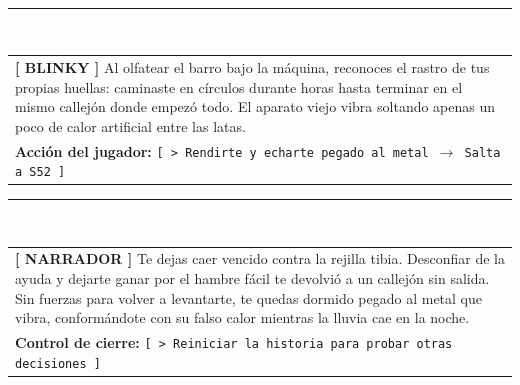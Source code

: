 \documentclass[11pt, a4paper]{article}
\begin{document}
\noindent
\begin{tabularx}{\textwidth}{|X|}
\hline
\rowcolor{colorAlerta}
\textbf{\textcolor{white}{PANTALLA S51 $\cdot$ Caminando en Círculos}} \hfill \small\textcolor{white}{Sentido: Olfato y Desengaño} \\ \hline
\rowcolor{colorTextoBox}
\textbf{\textcolor{colorEmisor}{[ BLINKY ]}} \vspace{0.2em}\newline
Al olfatear el barro bajo la máquina, reconoces el rastro de tus propias huellas: caminaste en círculos durante horas hasta terminar en el mismo callejón donde empezó todo. El aparato viejo vibra soltando apenas un poco de calor artificial entre las latas. \\ \hline
\rowcolor{colorBotonBox}
\textbf{Acción del jugador:} \newline
\texttt{[ > Rendirte y echarte pegado al metal $\rightarrow$ Salta a S52 ]} \\ \hline
\end{tabularx}

\vspace{1em}

\noindent
\begin{tabularx}{\textwidth}{|X|}
\hline
\rowcolor{colorAlerta}
\textbf{\textcolor{white}{PANTALLA S52 $\cdot$ Cierre del Final Malo [FINAL MALO F02]}} \hfill \small\textcolor{white}{Desenlace Trágico} \\ \hline
\rowcolor{colorTextoBox}
\textbf{\textcolor{colorAlerta}{[ NARRADOR ]}} \vspace{0.2em}\newline
Te dejas caer vencido contra la rejilla tibia. Desconfiar de la ayuda y dejarte ganar por el hambre fácil te devolvió a un callejón sin salida. Sin fuerzas para volver a levantarte, te quedas dormido pegado al metal que vibra, conformándote con su falso calor mientras la lluvia cae en la noche. \\ \hline
\rowcolor{colorBotonBox}
\textbf{Control de cierre:} \newline
\texttt{[ > Reiniciar la historia para probar otras decisiones ]} \\ \hline
\end{tabularx}

\newpage

\end{document}
